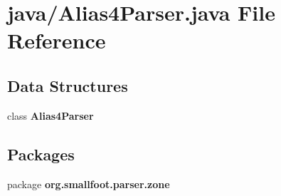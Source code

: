 \section{java/\-Alias4\-Parser.java File Reference}
\label{Alias4Parser_8java}
\subsection*{Data Structures}
\begin{DoxyCompactItemize}
\item 
class {\bf Alias4\-Parser}
\end{DoxyCompactItemize}
\subsection*{Packages}
\begin{DoxyCompactItemize}
\item 
package {\bf org.\-smallfoot.\-parser.\-zone}
\end{DoxyCompactItemize}
